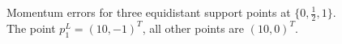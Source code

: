 \begin{figure}[h!]
\caption{Momentum errors for three equidistant support points at $\{0,\frac{1}{2},1\}$. The point $p_1^L=(10,-1)^T$, all other points are $(10,0)^T$.}
\label{fig:equidist_3_alles_default_ausser_p1_10_-1}
\end{figure}

